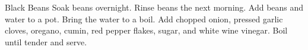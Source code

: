 \documentclass[../cookbook.tex]{subfiles}
\begin{document}
\begin{recipe}{Black Beans}{}{}
    Soak beans overnight. Rinse beans the next morning.
    Add beans and water to a pot. Bring the water to a boil.
    Add chopped onion, pressed garlic cloves, oregano,
    cumin, red pepper flakes, sugar, and white wine vinegar.
    Boil until tender and serve.
\end{recipe}
\end{document}
